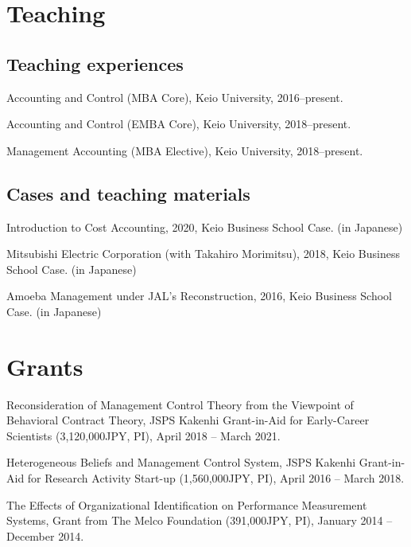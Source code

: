 \documentclass[letterpaper,uplatex]{article}
\renewenvironment{itemize}{
  \begin{list}{}{
    \setlength{\leftmargin}{1.5em}
  }
}{
  \end{list}
}
\begin{document}
\section*{Teaching}

\subsection*{Teaching experiences}

\begin{itemize}
	\item Accounting and Control (MBA Core), Keio University, 2016--present.
	\item Accounting and Control (EMBA Core), Keio University, 2018--present.
	\item Management Accounting (MBA Elective), Keio University, 2018--present.
\end{itemize}

\subsection*{Cases and teaching materials}

\begin{itemize}
   \item Introduction to Cost Accounting, 2020, Keio Business School Case. (in Japanese)
   \item Mitsubishi Electric Corporation (with Takahiro Morimitsu), 2018, Keio Business School Case. (in Japanese)
   \item Amoeba Management under JAL's Reconstruction, 2016, Keio Business School Case. (in Japanese)
\end{itemize}

\section*{Grants}

\begin{itemize}
\item Reconsideration of Management Control Theory from the Viewpoint of Behavioral Contract Theory, JSPS Kakenhi Grant-in-Aid for Early-Career Scientists (3,120,000JPY, PI), April 2018 -- March 2021.

\item Heterogeneous Beliefs and Management Control System, JSPS Kakenhi Grant-in-Aid for Research Activity Start-up (1,560,000JPY, PI), April 2016 -- March 2018.

\item The Effects of Organizational Identification on Performance Measurement Systems, Grant from The Melco Foundation (391,000JPY, PI), January 2014 -- December 2014.
\end{itemize}
\end{document}
